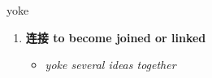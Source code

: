 
\begin{frame}
{\huge yoke}
\begin{center}
\begin{enumerate}\Large
  \item \textbf{连接 to become joined or linked}
  \begin{itemize}
    \item \em{\Large{yoke several ideas together}}
  \end{itemize}
\end{enumerate}
\end{center}
\end{frame}
